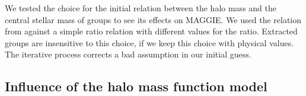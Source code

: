 We tested the choice for the initial relation between the halo mass and the
central stellar mass of groups to see its effects on MAGGIE\@. We used the
relation from \citet{BCW+10} against a simple ratio relation with different
values for the ratio. Extracted groups are insensitive to this choice, if we
keep this choice with physical values. The iterative process corrects a bad
assumption in our initial guess.

\subsection{Influence of the halo mass function model}

\begin{figure}[htbp]
    \centering
    \begin{minipage}{\linewidth}
        \centering
        \begin{minipage}{0.49\linewidth}
        \end{minipage}
        \begin{minipage}{0.49\linewidth}
        \end{minipage}
    \end{minipage}
    \begin{minipage}{\linewidth}
        \centering
        \begin{minipage}{0.49\linewidth}
        \end{minipage}
        \begin{minipage}{0.49\linewidth}
        \end{minipage}
        \begin{minipage}{0.49\linewidth}
        \end{minipage}
    \end{minipage}
\end{figure}

